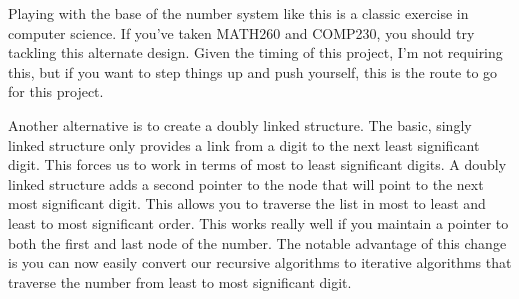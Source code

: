 \documentclass[10pt]{article}
\begin{document}
Playing with the base of the number system like this is a classic exercise in computer science. If you've taken MATH260 and COMP230, you should try tackling this alternate design. Given the timing of this project, I'm not requiring this, but if you want to step things up and push yourself, this is the route to go for this project. 

Another alternative is to create a doubly linked structure.  The basic, singly linked structure only provides a link from a digit to the next least significant digit.  This forces us to work in terms of most to least significant digits.  A doubly linked structure adds a second pointer to the node that will point to the next most significant digit.  This allows you to traverse the list in most to least and least to most significant order. This works really well if you maintain a pointer to both the first and last node of the number. The notable advantage of this change is you can now easily convert our recursive algorithms to iterative algorithms that traverse the number from least to most significant digit. 
\end{document}
